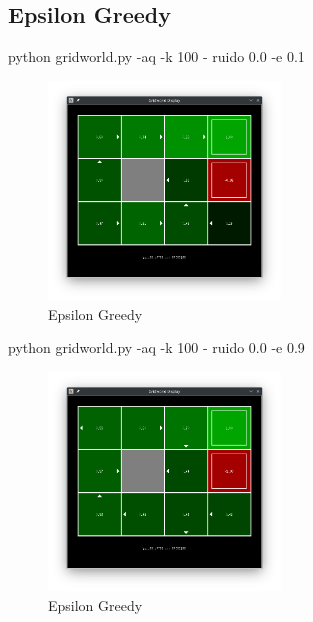 \documentclass{report}
\begin{document}
      \subsection{Epsilon Greedy} %
        python gridworld.py -aq -k 100 - ruido 0.0 -e 0.1
        \begin{figure}[H]
          \centering
          \includegraphics[width=0.55\textwidth]{./.img/ej41.png}
          \caption{Epsilon Greedy}
        \end{figure}
        python gridworld.py -aq -k 100 - ruido 0.0 -e 0.9
        \begin{figure}[H]
          \centering
          \includegraphics[width=0.55\textwidth]{./.img/ej42.png}
          \caption{Epsilon Greedy}
        \end{figure}
        \clearpage
\end{document}
